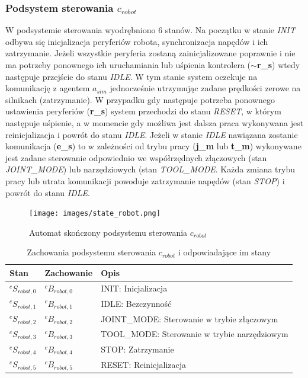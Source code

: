 \documentclass[a4paper, 12pt, twoside]{article}
\begin{document}
\subsubsection{Podsystem sterowania $c_{robot}$}
W podsystemie sterowania wyodrębniono 6 stanów. Na początku w stanie \textit{INIT} odbywa się inicjalizacja peryferiów robota, synchronizacja napędów i ich zatrzymanie. Jeżeli wszystkie peryferia zostaną zainicjalizowane poprawnie i nie ma potrzeby ponownego ich uruchamiania lub uśpienia kontrolera (\textbf{$\sim$r\_s}) wtedy następuje przejście do stanu \textit{IDLE}. W tym stanie system oczekuje na komunikację z agentem $a_{sim}$ jednocześnie utrzymując zadane prędkości zerowe na silnikach (zatrzymanie). W przypadku gdy następuje potrzeba ponownego ustawienia peryferiów (\textbf{r\_s}) system przechodzi do stanu \textit{RESET}, w którym następuje uśpienie, a w momencie gdy możliwa jest dalsza praca wykonywana jest reinicjalizacja i powrót do stanu \textit{IDLE}. Jeżeli w stanie \textit{IDLE} nawiązana zostanie komunikacja (\textbf{e\_s}) to w zależności od trybu pracy (\textbf{j\_m} lub \textbf{t\_m}) wykonywane jest zadane sterowanie odpowiednio we współrzędnych złączowych (stan \textit{JOINT\_MODE}) lub narzędziowych (stan \textit{TOOL\_MODE}. Każda zmiana trybu pracy lub utrata komunikacji powoduje zatrzymanie napędów (stan \textit{STOP}) i powrót do stanu \textit{IDLE}.

\begin{figure}[hbt!]
\centering
\texttt{[image: images/state\_robot.png]}
\caption{Automat skończony podsystemu sterowania $c_{robot}$ }
\label{fig:state_robot}
\end{figure}

\begin{table}[htb!]
\label{behaviour_robot}
\begin{center}
\caption{Zachowania podsystemu sterowania $c_{robot}$ i odpowiadające im stany}
\begin{tabular}{ | l | l | l |}
\hline
 Stan & Zachowanie & Opis \\ 
\hline
 $^cS_{robot,0}$ & $^cB_{robot,0}$ & INIT: Inicjalizacja  \\ 
\hline
 $^cS_{robot,1}$ & $^cB_{robot,1}$ & IDLE: Bezczynność \\
\hline
 $^cS_{robot,2}$ & $^cB_{robot,2}$ & JOINT\_MODE: Sterowanie w trybie złączowym \\
\hline
 $^cS_{robot,3}$ & $^cB_{robot,3}$ & TOOL\_MODE: Sterowanie w trybie narzędziowym \\
\hline
 $^cS_{robot,4}$ & $^cB_{robot,4}$ & STOP: Zatrzymanie \\
\hline
 $^cS_{robot,5}$ & $^cB_{robot,5}$ & RESET: Reinicjalizacja \\
\hline
\end{tabular}
\end{center}
\end{table}
\end{document}
